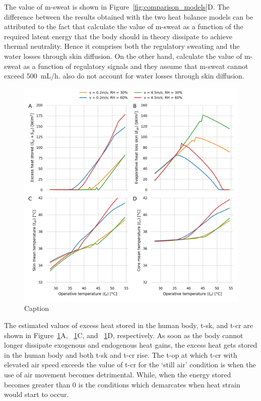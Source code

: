 The value of \ac{m-sweat} is shown in Figure~\ref{fig:comparison_models}D\@.
The difference between the results obtained with the two heat balance models can be attributed to the fact that \citeauthor{Jay2015} calculate the value of \ac{m-sweat} as a function of the required latent energy that the body should in theory dissipate to achieve thermal neutrality.
Hence it comprises both the regulatory sweating and the water losses through skin diffusion.
On the other hand, \citeauthor{GaggeSET} calculate the value of \ac{m-sweat} as a function of regulatory signals and they assume that \ac{m-sweat} cannot exceed 500~mL/h.
\citeauthor{GaggeSET} also do not account for water losses through skin diffusion.

\begin{figure}[b!]
    \centering
    \includegraphics[width=\textwidth]{figures/results_model_2.png}
    \caption{Caption}
    \label{fig:results_model_2}
\end{figure}

The estimated values of excess heat stored in the human body, \ac{t-sk}, and \ac{t-cr} are shown in Figure~\ref{fig:results_model_2}A, ~\ref{fig:results_model_2}C, and ~\ref{fig:results_model_2}D, respectively.
As soon as the body cannot longer dissipate exogenous and endogenous heat gains, the excess heat gets stored in the human body and both \ac{t-sk} and \ac{t-cr} rise.
The \ac{t-op} at which \ac{t-cr} with elevated air speed exceeds the value of \ac{t-cr} for the `still air' condition is when the use of air movement becomes detrimental.
While, when the energy stored becomes greater than 0 is the conditions which demarcates when heat strain would start to occur.

